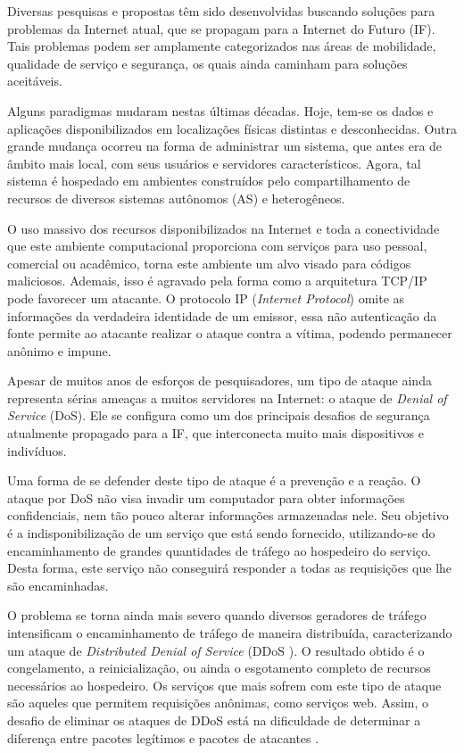 
Diversas pesquisas e propostas têm sido desenvolvidas buscando soluções para problemas da Internet atual, que se propagam para a Internet do Futuro (IF). Tais problemas podem ser amplamente categorizados nas áreas de mobilidade, qualidade de serviço e segurança, os quais ainda caminham para soluções aceitáveis. %

Alguns paradigmas mudaram nestas últimas décadas. Hoje, tem-se os dados e aplicações disponibilizados em localizações físicas distintas e desconhecidas. Outra grande mudança ocorreu na forma de administrar um sistema, que antes era de âmbito mais local, com seus usuários e servidores característicos. Agora, tal sistema é hospedado em ambientes construídos pelo compartilhamento de recursos de diversos sistemas autônomos (AS) e heterogêneos.

O uso massivo dos recursos disponibilizados na Internet e toda a conectividade que este ambiente computacional proporciona com serviços para uso pessoal, comercial ou acadêmico, torna este ambiente um alvo visado para códigos maliciosos. Ademais, isso é agravado pela forma como a arquitetura TCP/IP pode favorecer um atacante. O protocolo IP (\emph{Internet Protocol}) omite as informações da verdadeira identidade de um emissor, essa não autenticação da fonte permite ao atacante realizar o ataque contra a vítima, podendo permanecer anônimo e impune. %

Apesar de muitos anos de esforços de pesquisadores, um tipo de ataque ainda representa sérias ameaças a muitos servidores na Internet: o ataque de  \emph{Denial of Service} (DoS). Ele se configura como um dos principais desafios de segurança atualmente propagado para a IF, que interconecta muito mais dispositivos e indivíduos. 


Uma forma de se defender deste tipo de ataque é a prevenção e a reação. O ataque por DoS não visa invadir um computador para obter informações confidenciais, nem tão pouco alterar informações armazenadas nele. Seu objetivo é a indisponibilização de um serviço que está sendo fornecido, utilizando-se do encaminhamento de grandes quantidades de tráfego ao hospedeiro do serviço. Desta forma, este serviço não conseguirá responder a todas as requisições que lhe são encaminhadas. 

O problema se torna ainda mais severo quando diversos geradores de tráfego intensificam o encaminhamento de tráfego de maneira distribuída, caracterizando um ataque de \emph{Distributed Denial of Service} (DDoS \cite{Sachdeva08ddosincidents}). O resultado obtido é o congelamento, a reinicialização, ou ainda o esgotamento completo de recursos necessários ao hospedeiro. Os serviços que mais sofrem com este tipo de ataque são aqueles que permitem requisições anônimas, como serviços web. Assim, o desafio de eliminar os ataques de DDoS está na dificuldade de determinar a diferença entre pacotes legítimos e pacotes de atacantes \cite{Li:2009:DDA:1683304.1684620}.


